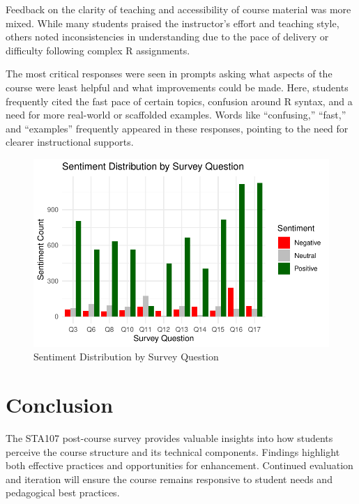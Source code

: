 \documentclass[
  letterpaper,
  DIV=11,
  numbers=noendperiod]{scrartcl}
\begin{document}
Feedback on the clarity of teaching and accessibility of course material
was more mixed. While many students praised the instructor's effort and
teaching style, others noted inconsistencies in understanding due to the
pace of delivery or difficulty following complex R assignments.

The most critical responses were seen in prompts asking what aspects of
the course were least helpful and what improvements could be made. Here,
students frequently cited the fast pace of certain topics, confusion
around R syntax, and a need for more real-world or scaffolded examples.
Words like ``confusing,'' ``fast,'' and ``examples'' frequently appeared
in these responses, pointing to the need for clearer instructional
supports.

\begin{figure}[H]

\caption{Sentiment Distribution by Survey Question}

{\centering \includegraphics{paper_files/figure-pdf/sentiment-plot-1.pdf}

}

\end{figure}%

\section{Conclusion}\label{conclusion}

The STA107 post-course survey provides valuable insights into how
students perceive the course structure and its technical components.
Findings highlight both effective practices and opportunities for
enhancement. Continued evaluation and iteration will ensure the course
remains responsive to student needs and pedagogical best practices.
\end{document}
